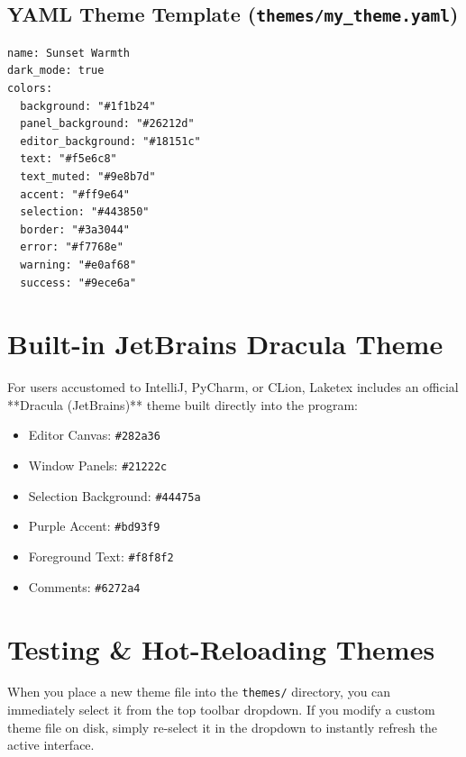 \documentclass[11pt, a4paper]{article}
\begin{document}
\subsection{YAML Theme Template (\texttt{themes/my\_theme.yaml})}
\begin{verbatim}
name: Sunset Warmth
dark_mode: true
colors:
  background: "#1f1b24"
  panel_background: "#26212d"
  editor_background: "#18151c"
  text: "#f5e6c8"
  text_muted: "#9e8b7d"
  accent: "#ff9e64"
  selection: "#443850"
  border: "#3a3044"
  error: "#f7768e"
  warning: "#e0af68"
  success: "#9ece6a"
\end{verbatim}

\section{Built-in JetBrains Dracula Theme}

For users accustomed to IntelliJ, PyCharm, or CLion, Laketex includes an official **Dracula (JetBrains)** theme built directly into the program:
\begin{itemize}
    \item Editor Canvas: \texttt{\#282a36}
    \item Window Panels: \texttt{\#21222c}
    \item Selection Background: \texttt{\#44475a}
    \item Purple Accent: \texttt{\#bd93f9}
    \item Foreground Text: \texttt{\#f8f8f2}
    \item Comments: \texttt{\#6272a4}
\end{itemize}

\section{Testing \& Hot-Reloading Themes}

When you place a new theme file into the \texttt{themes/} directory, you can immediately select it from the top toolbar dropdown. If you modify a custom theme file on disk, simply re-select it in the dropdown to instantly refresh the active interface.
\end{document}
